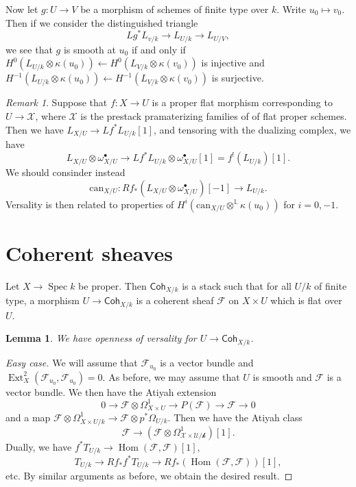 \documentclass[leqno, openany]{memoir}
\newtheorem{lem}[thm]{Lemma}
\theoremstyle{definition}
\theoremstyle{remark}
\newtheorem{rmk}[thm]{Remark}
\theoremstyle{plain}
\theoremstyle{definition}
\theoremstyle{remark}
\newcommand{\mc}[1]{\mathcal{#1}}
\newcommand{\mr}[1]{\mathrm{#1}}
\newcommand{\ms}[1]{\mathsf{#1}}
\DeclareMathOperator{\Hom}{Hom}
\DeclareMathOperator{\Ext}{Ext}
\DeclareMathOperator{\Spec}{Spec}
\begin{document}
Now let $g \colon U \to V$ be a morphism of schemes of finite type over $k$. Write $u_0 \mapsto v_0$. Then if we consider the distinguished triangle
\[ L g^* L_{v/k} \to L_{U/k} \to L_{U/V}, \]
we see that $g$ is smooth at $u_0$ if and only if $H^0(L_{U/k} \otimes \kappa(u_0)) \gets H^0(L_{V/k} \otimes \kappa(v_0))$ is injective and $H^{-1}(L_{U/k} \otimes \kappa(u_0)) \gets H^{-1}(L_{V/k} \otimes \kappa(v_0))$ is surjective.

\begin{rmk}
    Suppose that $f \colon X \to U$ is a proper flat morphism corresponding to $U \to \mc{X}$, where $\mc{X}$ is the prestack pramaterizing families of of flat proper schemes. Then we have $L_{X/U} \to L f^* L_{U/k}[1]$, and tensoring with the dualizing complex, we have
    \[ L_{X/U} \otimes \omega_{X/U}^{\bullet} \to L f^* L_{U/k} \otimes \omega_{X/U}^{\bullet}[1] = f^! (L_{U/k})[1]. \]
    We should consinder instead
    \[ \mr{can}_{X/U} \colon R f_* (L_{X/U} \otimes \omega_{X/U}^{\bullet})[-1] \to L_{U/k}. \]
    Versality is then related to properties of $H^i(\mr{can}_{X/U} \otimes^{\mathbb{L}} \kappa(u_0))$ for $i = 0,-1$.
\end{rmk}

\section{Coherent sheaves}%
\label{sec:coherent_sheaves}

Let $X \to \Spec k$ be proper. Then $\ms{Coh}_{X/k}$ is a stack such that for all $U/k$ of finite type, a morphism $U \to \ms{Coh}_{X/k}$ is a coherent sheaf $\mc{F}$ on $X \times U$ which is flat over $U$.

\begin{lem}
    We have openness of versality for $U \to \ms{Coh}_{X/k}$.
\end{lem}

\begin{proof}[Easy case]
    We will assume that $\mc{F}_{u_0}$ is a vector bundle and $\Ext^2_X(\mc{F}_{u_0}, \mc{F}_{u_0}) = 0$. As before, we may assume that $U$ is smooth and $\mc{F}$ is a vector bundle. We then have the Atiyah extension
    \[ 0 \to \mc{F} \otimes \Omega^1_{X \times U} \to P(\mc{F}) \to \mc{F} \to 0 \]
    and a map $\mc{F} \otimes \Omega^1_{X \times U/k} \to \mc{F} \otimes p^* \Omega_{U/k}$. Then we have the Atiyah class
    \[ \mc{{F} \to (\mc{F} \otimes \Omega^1_{X \times U/k})[1]}. \]
    Dually, we have $f^* T_{U/k} \to \Hom(\mc{F}, \mc{F})[1]$, 
    \[ T_{U/k} \to R f_* f^* T_{U/k} \to R f_* (\Hom(\mc{F}, \mc{F}))[1], \]
    etc. By similar arguments as before, we obtain the desired result.
\end{proof}
\end{document}
